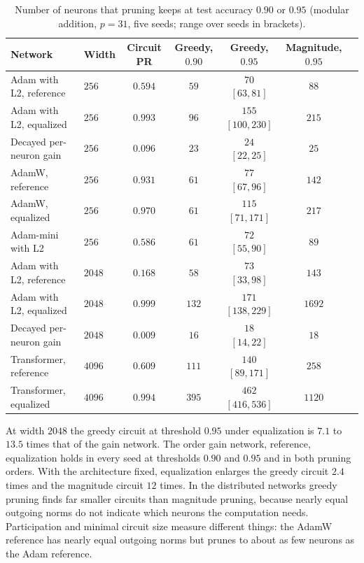 \documentclass{article} %
\begin{document}
\begin{table}[!ht]
\caption{Number of neurons that pruning keeps at test accuracy $0.90$ or $0.95$ (modular addition, $p=31$, five seeds; range over seeds in brackets).}
\label{tab:minimal}
\begin{center}
\footnotesize
\setlength{\tabcolsep}{4pt}
\begin{tabular}{llccccc}
\toprule
Network & Width & Circuit PR & Greedy, $0.90$ & Greedy, $0.95$ & Magnitude, $0.95$ \\
\midrule
Adam with L2, reference & $256$ & $0.594$ & $59$ & $70$ $[63, 81]$ & $88$ \\
Adam with L2, equalized & $256$ & $0.993$ & $96$ & $155$ $[100, 230]$ & $215$ \\
Decayed per-neuron gain & $256$ & $0.096$ & $23$ & $24$ $[22, 25]$ & $25$ \\
AdamW, reference & $256$ & $0.931$ & $61$ & $77$ $[67, 96]$ & $142$ \\
AdamW, equalized & $256$ & $0.970$ & $61$ & $115$ $[71, 171]$ & $217$ \\
Adam-mini with L2 & $256$ & $0.586$ & $61$ & $72$ $[55, 90]$ & $89$ \\
\midrule
Adam with L2, reference & $2048$ & $0.168$ & $58$ & $73$ $[33, 98]$ & $143$ \\
Adam with L2, equalized & $2048$ & $0.999$ & $132$ & $171$ $[138, 229]$ & $1692$ \\
Decayed per-neuron gain & $2048$ & $0.009$ & $16$ & $18$ $[14, 22]$ & $18$ \\
\midrule
Transformer, reference & $4096$ & $0.609$ & $111$ & $140$ $[89, 171]$ & $258$ \\
Transformer, equalized & $4096$ & $0.994$ & $395$ & $462$ $[416, 536]$ & $1120$ \\
\bottomrule
\end{tabular}
\end{center}
\end{table}

At width $2048$ the greedy circuit at threshold $0.95$ under equalization is $7.1$ to $13.5$ times that of the gain network. The order gain network, reference, equalization holds in every seed at thresholds $0.90$ and $0.95$ and in both pruning orders. With the architecture fixed, equalization enlarges the greedy circuit $2.4$ times and the magnitude circuit $12$ times. In the distributed networks greedy pruning finds far smaller circuits than magnitude pruning, because nearly equal outgoing norms do not indicate which neurons the computation needs. Participation and minimal circuit size measure different things: the AdamW reference has nearly equal outgoing norms but prunes to about as few neurons as the Adam reference.
\end{document}
